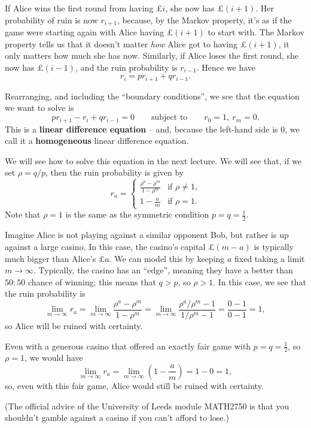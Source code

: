 \documentclass[
  a4paper,
]{article}
\theoremstyle{definition}
\theoremstyle{definition}
\theoremstyle{definition}
\theoremstyle{remark}
\begin{document}
If Alice wins the first round from having £\(i\), she now has £\((i+1)\). Her probability of ruin is now \(r_{i+1}\), because, by the Markov property, it's as if the game were starting again with Alice having £\((i+1)\) to start with. The Markov property tells us that it doesn't matter \emph{how} Alice got to having £\((i+1)\), it only matters how much she has now. Similarly, if Alice loses the first round, she now has £\((i-1)\), and the ruin probability is \(r_{i-1}\). Hence we have
\[ r_i = pr_{i+1} + qr_{i-1}. \]

Rearranging, and including the ``boundary conditions'', we see that the equation we want to solve is
\[ pr_{i+1} - r_i + qr_{i-1} = 0 \qquad \text{subject to} \qquad r_0 = 1,\ r_m = 0. \]
This is a \textbf{linear difference equation} -- and, because the left-hand side is \(0\), we call it a \textbf{homogeneous} linear difference equation.

We will see how to solve this equation in the next lecture. We will see that, if we set \(\rho = q/p\), then the ruin probability is given by
\[ r_a = \begin{cases} \displaystyle\frac{\rho^a - \rho^m}{1 - \rho^m} & \text{if $\rho \neq 1$,} \\[0.35cm]
           1 - \displaystyle\frac{a}{m} & \text{if $\rho = 1$.} \end{cases} \]
Note that \(\rho = 1\) is the same as the symmetric condition \(p = q = \frac12\).

Imagine Alice is not playing against a similar opponent Bob, but rather is up against a large casino. In this case, the casino's capital £\((m-a)\) is typically much bigger than Alice's £\(a\). We can model this by keeping \(a\) fixed taking a limit \(m \to \infty\). Typically, the casino has an ``edge'', meaning they have a better than \(50:50\) chance of winning; this means that \(q > p\), so \(\rho > 1\). In this case, we see that the ruin probability is
\[ \lim_{m \to \infty} r_a = \lim_{m \to \infty} \frac{\rho^a - \rho^m}{1 - \rho^m} = \lim_{m \to \infty} \frac{\rho^a/\rho^m - 1}{1/\rho^m - 1} = \frac{0-1}{0-1} = 1, \]
so Alice will be ruined with certainty.

Even with a generous casino that offered an exactly fair game with \(p = q = \frac12\), so \(\rho = 1\), we would have
\[ \lim_{m \to \infty} r_a = \lim_{m \to \infty}\left( 1 - \frac{a}{m} \right) = 1-0 = 1 , \]
so, even with this fair game, Alice would still be ruined with certainty.

(The official advice of the University of Leeds module MATH2750 is that you shouldn't gamble against a casino if you can't afford to lose.)
\end{document}
